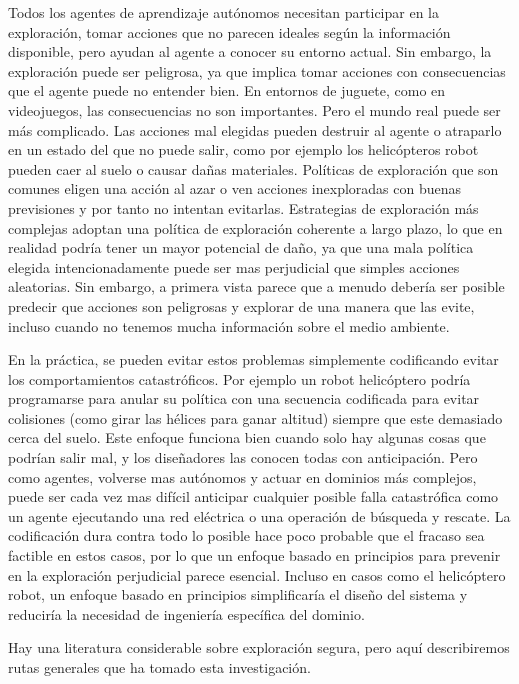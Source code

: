 \documentclass[12pt,a4paper]{article}
\begin{document}
Todos los agentes de aprendizaje autónomos necesitan participar en la exploración, tomar acciones que no parecen ideales según la información disponible, pero ayudan al agente a conocer su entorno actual. Sin embargo, la exploración puede ser peligrosa, ya que implica tomar acciones con consecuencias que el agente puede no entender bien. En entornos de juguete, como en videojuegos, las consecuencias no son importantes. Pero el mundo real puede ser más complicado. Las acciones mal elegidas pueden destruir al agente o atraparlo en un estado del que no puede salir, como por ejemplo los helicópteros robot pueden caer al suelo o causar dañas materiales. Políticas de exploración que son comunes eligen una acción al azar o ven acciones inexploradas con buenas previsiones y por tanto no intentan evitarlas. Estrategias de exploración más complejas adoptan una política de exploración coherente a largo plazo, lo que en realidad podría tener un mayor potencial de daño, ya que una mala política elegida intencionadamente puede ser mas perjudicial que simples acciones aleatorias. Sin embargo, a primera vista parece que a menudo debería ser posible predecir que acciones son peligrosas y explorar de una manera que las evite, incluso cuando no tenemos mucha información sobre el medio ambiente.

En la práctica, se pueden evitar estos problemas simplemente codificando evitar los comportamientos catastróficos. Por ejemplo un robot helicóptero podría programarse para anular su política con una secuencia codificada para evitar colisiones (como girar las hélices para ganar altitud) siempre que este demasiado cerca del suelo. Este enfoque funciona bien cuando solo hay algunas cosas que podrían salir mal, y los diseñadores las conocen todas con anticipación. Pero como agentes, volverse mas autónomos y actuar en dominios más complejos, puede ser cada vez mas difícil anticipar cualquier posible falla catastrófica como un agente ejecutando una red eléctrica o una operación de búsqueda y rescate. La codificación dura contra todo lo posible hace poco probable que el fracaso sea factible en estos casos, por lo que un enfoque basado en principios para prevenir en la exploración perjudicial parece esencial. Incluso en casos como el helicóptero robot, un enfoque basado en principios simplificaría el diseño del sistema y reduciría la necesidad de ingeniería específica del dominio.

Hay una literatura considerable sobre exploración segura, pero aquí describiremos rutas generales que ha tomado esta investigación.
\end{document}
